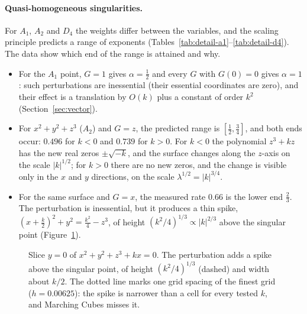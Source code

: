 \paragraph{Quasi-homogeneous singularities.} For $A_1$, $A_2$ and $D_4$ the
weights differ between the variables, and the scaling principle predicts a
range of exponents (Tables~\ref{tab:detail-a1}--\ref{tab:detail-d4}). The data
show which end of the range is attained and why.
\begin{itemize}
    \item For the $A_1$ point, $G=1$ gives $\alpha=\frac12$ and every $G$ with
          $G(0)=0$ gives $\alpha=1$: such perturbations are inessential
          (their essential coordinates are zero), and their effect is a
          translation by $O(k)$ plus a constant of order $k^2$
          (Section~\ref{sec:vector}).
    \item For $x^2+y^2+z^3$ ($A_2$) and $G=z$, the predicted range is
          $[\frac12,\frac34]$, and both ends occur: $0.496$ for $k<0$ and $0.739$
          for $k>0$. For $k<0$ the polynomial $z^3+kz$ has the new real zeros
          $\pm\sqrt{-k}$, and the surface changes along the $z$-axis on the scale
          $|k|^{1/2}$; for $k>0$ there are no new zeros, and the change is
          visible only in the $x$ and $y$ directions, on the scale
          $\lambda^{1/2}=|k|^{3/4}$.
    \item For the same surface and $G=x$, the measured rate $0.66$ is the lower
          end $\frac23$. The perturbation is inessential, but it produces a thin
          spike, $(x+\frac k2)^2+y^2=\frac{k^2}{4}-z^3$, of height
          $(k^2/4)^{1/3}\propto|k|^{2/3}$ above the singular point
          (Figure~\ref{fig:spike-slice}).
\end{itemize}


\begin{figure}[!h]
\centering
{}
\caption[The spike of an $A_2$ point]{Slice $y=0$ of $x^2+y^2+z^3+kx=0$. The
perturbation adds a spike above the singular point, of height
$(k^2/4)^{1/3}$ (dashed) and width about $k/2$. The dotted line marks one grid
spacing of the finest grid ($h=0.00625$): the spike is narrower than a cell
for every tested $k$, and Marching Cubes misses it.}
\label{fig:spike-slice}
\end{figure}

